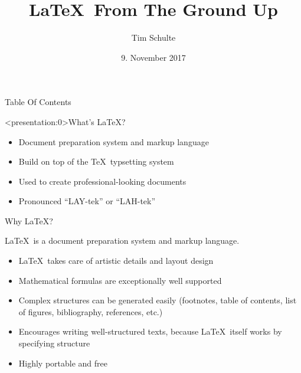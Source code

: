 \documentclass[table]{beamer}
\title{\LaTeX\ From The Ground Up}
\author{Tim Schulte}
\institute{Albert-Ludwigs-Universität Freiburg\\Grundlagen der Künstlichen Intelligenz}
\date{9. November 2017}
\newcommand{\latex}{\LaTeX\ }
\begin{document}
\begin{frame}[plain]
    \titlepage
\end{frame}

\begin{frame}{Table Of Contents}
    \tableofcontents
\end{frame}

\begin{frame}<presentation:0>{What's \LaTeX ?}
    \begin{itemize}
        \item Document preparation system and markup language
        \item Build on top of the \TeX\ typsetting system %
        \item Used to create professional-looking documents %
        \item Pronounced ``LAY-tek'' or ``LAH-tek''
    \end{itemize}
\end{frame}

\begin{frame}{Why \LaTeX ?}
    \begin{center}
        \textnormal{\latex is a document preparation system and markup language.}
    \end{center}
    \begin{itemize}
        \item \latex takes care of artistic details and layout design
        \item Mathematical formulas are exceptionally well supported
        \item Complex structures can be generated easily (footnotes, table
        of contents, list of figures, bibliography, references, etc.)
        \item Encourages writing well-structured texts, because \latex itself
        works by specifying structure
        \item Highly portable and free
    \end{itemize}
\end{frame}
\end{document}
